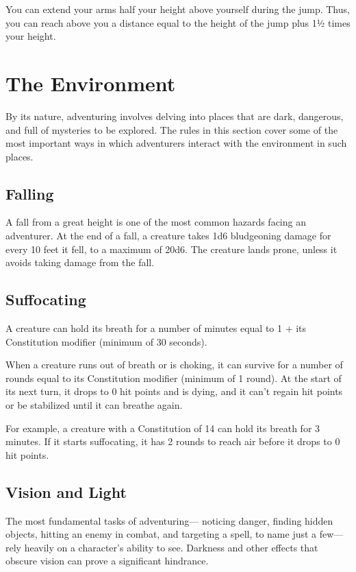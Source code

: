 You can extend your arms half your height above yourself during the jump. Thus, you can reach above you a distance equal to the height of the jump plus 1½ times your height.

\section{The Environment}

By its nature, adventuring involves delving into places that are dark, dangerous, and full of mysteries to be explored. The rules in this section cover some of the most important ways in which adventurers interact with the environment in such places.

\subsection{Falling}

A fall from a great height is one of the most common hazards facing an adventurer. At the end of a fall, a creature takes 1d6 bludgeoning damage for every 10 feet it fell, to a maximum of 20d6. The creature lands prone, unless it avoids taking damage from the fall.

\subsection{Suffocating}

A creature can hold its breath for a number of minutes equal to 1 + its Constitution modifier (minimum of 30 seconds).

When a creature runs out of breath or is choking, it can survive for a number of rounds equal to its Constitution modifier (minimum of 1 round). At the start of its next turn, it drops to 0 hit points and is dying, and it can't regain hit points or be stabilized until it can breathe again.

For example, a creature with a Constitution of 14 can hold its breath for 3 minutes. If it starts suffocating, it has 2 rounds to reach air before it drops to 0 hit points.

\subsection{Vision and Light}

The most fundamental tasks of adventuring— noticing danger, finding hidden objects, hitting an enemy in combat, and targeting a spell, to name just a few—rely heavily on a character's ability to see. Darkness and other effects that obscure vision can prove a significant hindrance.

